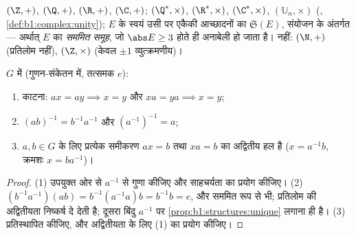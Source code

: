 \begin{example}\label{ex:b1:structures:groups}
$(\Z, +)$, $(\Q, +)$, $(\R, +)$, $(\C, +)$; $(\Q^*, \times)$, $(\R^*,
\times)$, $(\C^*, \times)$, $(\mathbb{U}_n, \times)$ (,
\cref{def:b1:complex:unity});  $E$ के स्वयं उसी पर एकैकी आच्छादनों का
 $\mathfrak{S}(E)$, संयोजन के अंतर्गत --- अर्थात् $E$ का \emph{सममित
समूह}, जो $\abs E \geq 3$ होते ही अनाबेली हो जाता है। 
नहीं: $(\N, +)$ (प्रतिलोम नहीं), $(\Z, \times)$ (केवल $\pm 1$
व्युत्क्रमणीय)।
\end{example}

\begin{proposition}[संगणना के नियम]\label{prop:b1:structures:rules}
 $G$ में (गुणन-संकेतन में, तत्समक $e$):
\begin{enumerate}
  \item काटना: $ax = ay \implies x = y$ और $xa = ya \implies x = y$;
  \item $(ab)^{-1} = b^{-1} a^{-1}$ और $(a^{-1})^{-1} = a$;
  \item $a, b \in G$ के लिए प्रत्येक समीकरण $ax = b$ तथा $xa = b$ का
  अद्वितीय हल है ($x = a^{-1}b$, क्रमशः $x = b a^{-1}$)।
\end{enumerate}
\end{proposition}

\begin{proof}
(1) उपयुक्त ओर से $a^{-1}$ से गुणा कीजिए और साहचर्यता का प्रयोग कीजिए। (2)
$(b^{-1}a^{-1})(ab) = b^{-1}(a^{-1}a)b = b^{-1}b = e$, और सममित रूप से भी;
प्रतिलोम की अद्वितीयता निष्कर्ष दे देती है; दूसरा बिंदु $a^{-1}$ पर
\cref{prop:b1:structures:unique} लगाना ही है। (3) प्रतिस्थापित कीजिए, और
अद्वितीयता के लिए (1) का प्रयोग कीजिए।
\end{proof}

